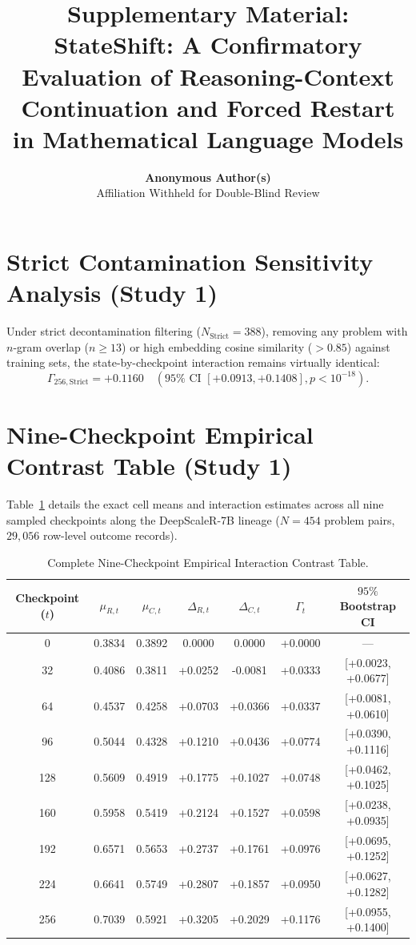 \documentclass[11pt]{article}
\title{\textbf{Supplementary Material: StateShift: A Confirmatory Evaluation of Reasoning-Context Continuation and Forced Restart in Mathematical Language Models}}
\author{
  \textbf{Anonymous Author(s)} \\
  Affiliation Withheld for Double-Blind Review \\
}
\date{}
\begin{document}
\maketitle

\section{Strict Contamination Sensitivity Analysis (Study 1)}
Under strict decontamination filtering ($N_{\text{Strict}} = 388$), removing any problem with $n$-gram overlap ($n \ge 13$) or high embedding cosine similarity ($> 0.85$) against training sets, the state-by-checkpoint interaction remains virtually identical:
\begin{equation}
\Gamma_{256,\text{Strict}} = +0.1160 \quad (95\% \text{ CI } [+0.0913, +0.1408], p < 10^{-18}).
\end{equation}

\section{Nine-Checkpoint Empirical Contrast Table (Study 1)}
Table~\ref{tab:supp_trajectory} details the exact cell means and interaction estimates across all nine sampled checkpoints along the DeepScaleR-7B lineage ($N=454$ problem pairs, $29,056$ row-level outcome records).

\begin{table}[h]
\centering
\caption{Complete Nine-Checkpoint Empirical Interaction Contrast Table.}
\label{tab:supp_trajectory}
\begin{tabular}{ccccccc}
\toprule
Checkpoint ($t$) & $\mu_{R,t}$ & $\mu_{C,t}$ & $\Delta_{R,t}$ & $\Delta_{C,t}$ & $\Gamma_t$ & $95\%$ Bootstrap CI \\
\midrule
0   & 0.3834 & 0.3892 & 0.0000 & 0.0000 & +0.0000 & --- \\
32  & 0.4086 & 0.3811 & +0.0252 & -0.0081 & +0.0333 & [+0.0023, +0.0677] \\
64  & 0.4537 & 0.4258 & +0.0703 & +0.0366 & +0.0337 & [+0.0081, +0.0610] \\
96  & 0.5044 & 0.4328 & +0.1210 & +0.0436 & +0.0774 & [+0.0390, +0.1116] \\
128 & 0.5609 & 0.4919 & +0.1775 & +0.1027 & +0.0748 & [+0.0462, +0.1025] \\
160 & 0.5958 & 0.5419 & +0.2124 & +0.1527 & +0.0598 & [+0.0238, +0.0935] \\
192 & 0.6571 & 0.5653 & +0.2737 & +0.1761 & +0.0976 & [+0.0695, +0.1252] \\
224 & 0.6641 & 0.5749 & +0.2807 & +0.1857 & +0.0950 & [+0.0627, +0.1282] \\
256 & 0.7039 & 0.5921 & +0.3205 & +0.2029 & +0.1176 & [+0.0955, +0.1400] \\
\bottomrule
\end{tabular}
\end{table}
\end{document}
